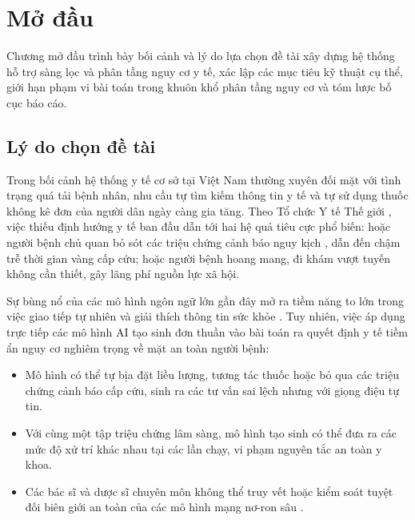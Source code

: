 \chapter*{Mở đầu}
{}
\label{ch:modau}

\begin{muctieu}
Chương mở đầu trình bày bối cảnh và lý do lựa chọn đề tài xây dựng hệ thống
hỗ trợ sàng lọc và phân tầng nguy cơ y tế, xác lập các mục tiêu kỹ thuật cụ
thể, giới hạn phạm vi bài toán trong khuôn khổ phân tầng nguy cơ và tóm lược
bố cục báo cáo.
\end{muctieu}

\section*{Lý do chọn đề tài}
{}

Trong bối cảnh hệ thống y tế cơ sở tại Việt Nam thường xuyên đối mặt với tình
trạng quá tải bệnh nhân, nhu cầu tự tìm kiếm thông tin y tế và tự sử dụng thuốc
không kê đơn  của người dân ngày càng gia tăng.
Theo Tổ chức Y tế Thế giới \cite{WHO2021}, việc thiếu định hướng y tế ban đầu
dẫn tới hai hệ quả tiêu cực phổ biến: hoặc người bệnh chủ quan bỏ sót các
triệu chứng cảnh báo nguy kịch , dẫn đến chậm trễ thời gian
vàng cấp cứu; hoặc người bệnh hoang mang, đi khám vượt tuyến không cần thiết,
gây lãng phí nguồn lực xã hội.

Sự bùng nổ của các mô hình ngôn ngữ lớn 
gần đây mở ra tiềm năng to lớn trong việc giao tiếp tự nhiên và giải thích
thông tin sức khỏe \cite{Singhal2023, Thirunavukarasu2023}. Tuy nhiên, việc áp
dụng trực tiếp các mô hình AI tạo sinh đơn thuần vào bài toán ra quyết định y tế
tiềm ẩn nguy cơ nghiêm trọng về mặt an toàn người bệnh:
\begin{itemize}[leftmargin=1.6em, itemsep=2pt]
  \item {} Mô hình có thể tự bịa đặt
        liều lượng, tương tác thuốc hoặc bỏ qua các triệu chứng cảnh báo cấp
        cứu, sinh ra các tư vấn sai lệch nhưng với giọng điệu tự tin.
  \item {} Với cùng một tập triệu
        chứng lâm sàng, mô hình tạo sinh có thể đưa ra các mức độ xử trí khác
        nhau tại các lần chạy, vi phạm nguyên tắc an toàn y khoa.
  \item {} Các bác sĩ và dược
        sĩ chuyên môn không thể truy vết hoặc kiểm soát tuyệt đối biên giới an
        toàn của các mô hình mạng nơ-ron sâu \cite{Musen2014}.
\end{itemize}

